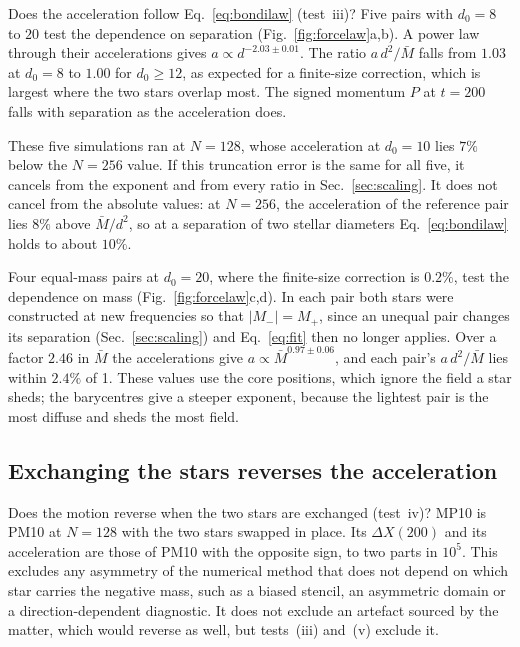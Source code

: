 \documentclass[twocolumn,floatfix,aps,prd,superscriptaddress,nofootinbib]{revtex4-2}
\begin{document}
Does the acceleration follow Eq.~\eqref{eq:bondilaw} (test~iii)? Five pairs with $d_0=8$ to $20$ test the dependence on separation (Fig.~\ref{fig:forcelaw}a,b). A power law through their accelerations gives $a\propto d^{-2.03\pm0.01}$. The ratio $a\,d^2/\bar M$ falls from $1.03$ at $d_0=8$ to $1.00$ for $d_0\ge12$, as expected for a finite-size correction, which is largest where the two stars overlap most. The signed momentum $P$ at $t=200$ falls with separation as the acceleration does.

These five simulations ran at $N=128$, whose acceleration at $d_0=10$ lies $7\%$ below the $N=256$ value. If this truncation error is the same for all five, it cancels from the exponent and from every ratio in Sec.~\ref{sec:scaling}. It does not cancel from the absolute values: at $N=256$, the acceleration of the reference pair lies $8\%$ above $\bar M/d^2$, so at a separation of two stellar diameters Eq.~\eqref{eq:bondilaw} holds to about $10\%$.

Four equal-mass pairs at $d_0=20$, where the finite-size correction is $0.2\%$, test the dependence on mass (Fig.~\ref{fig:forcelaw}c,d). In each pair both stars were constructed at new frequencies so that $|M_-|=M_+$, since an unequal pair changes its separation (Sec.~\ref{sec:scaling}) and Eq.~\eqref{eq:fit} then no longer applies. Over a factor $2.46$ in $\bar M$ the accelerations give $a\propto\bar M^{0.97\pm0.06}$, and each pair's $a\,d^2/\bar M$ lies within $2.4\%$ of 1. These values use the core positions, which ignore the field a star sheds; the barycentres give a steeper exponent, because the lightest pair is the most diffuse and sheds the most field.

\subsection{Exchanging the stars reverses the acceleration}
\label{sec:mirror}

Does the motion reverse when the two stars are exchanged (test~iv)? MP10 is PM10 at $N=128$ with the two stars swapped in place. Its $\Delta X(200)$ and its acceleration are those of PM10 with the opposite sign, to two parts in $10^5$. This excludes any asymmetry of the numerical method that does not depend on which star carries the negative mass, such as a biased stencil, an asymmetric domain or a direction-dependent diagnostic. It does not exclude an artefact sourced by the matter, which would reverse as well, but tests~(iii) and~(v) exclude it.
\end{document}
